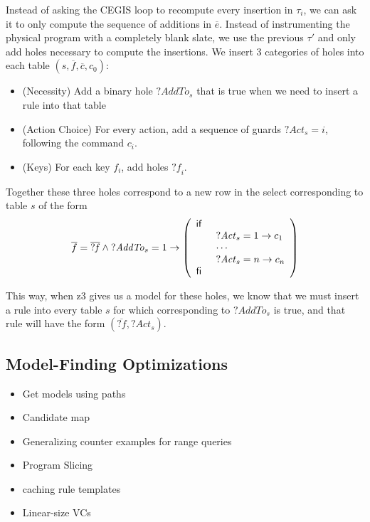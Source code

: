 
Instead of asking the CEGIS loop to recompute every insertion in
$\tau_i$, we can ask it to only compute the sequence of additions in
$\overline{e}$. Instead of instrumenting the physical program with a
completely blank slate, we use the previous $\tau'$ and only add holes
necessary to compute the insertions. We insert 3 categories of holes
into each table $(s, \overline f, \overline c, c_0)$:
\begin{itemize}
\item (Necessity) Add a binary hole $\mathit{?AddTo}_s$ that is true
  when we need to insert a rule into that table
\item (Action Choice) For every action, add a sequence of guards
  $\mathit{?Act}_s = i$, following the command $c_i$.
\item (Keys) For each key $f_i$, add holes $\mathit{?f}_i$.
\end{itemize}

Together these three holes correspond to a new row in the select
corresponding to table $s$ of the form
\[
  \begin{array}l
    \overline{f} = \overline{\mathit{?f}} \wedge \mathit{?AddTo}_s = 1
    \to \left(\begin{array}l \IF \\
          \qquad \mathit{?Act}_s = 1 \to c_1 \\
          \qquad \cdots\\
          \qquad \mathit{?Act}_s = n \to c_n \\
          \ENDIF
        \end{array} \right)
  \end{array}
\]

This way, when z3 gives us a model for these holes, we know that we
must insert a rule into every table $s$ for which corresponding to
$\mathit{?AddTo}_s$ is true, and that rule will have the form
$(\overline{\mathit{?f}}, \mathit{?Act}_s)$.



\subsection{Model-Finding Optimizations}
\begin{itemize}
\item Get models using paths
\item Candidate map
\item Generalizing counter examples for range queries
\item Program Slicing
\item caching rule templates
\item Linear-size VCs
\end{itemize}

